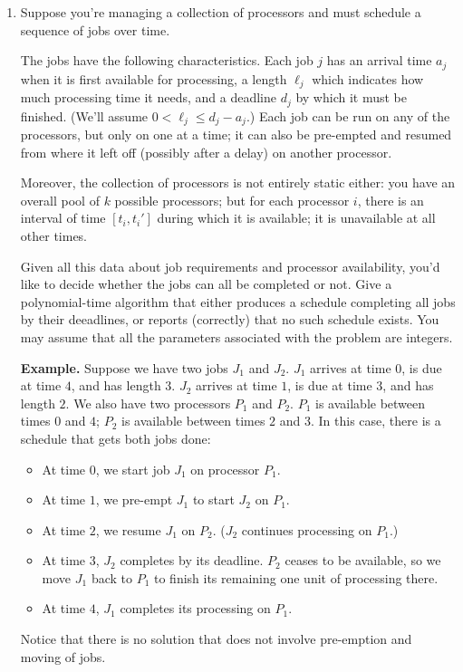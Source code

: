 \documentclass[12pt]{article}
\begin{document}
\begin{enumerate}
\item

Suppose you're managing a collection of processors
and must schedule a sequence of jobs over time.

The jobs have the following characteristics.
Each job $j$ has an arrival time $a_j$
when it is first available for processing,
a length $\ell_j$ which indicates how much processing
time it needs,
and a deadline $d_j$ by which it must be finished.
(We'll assume $0 < \ell_j \leq d_j - a_j$.)
Each job can be run on any of the processors,
but only on one at a time; it can also be
pre-empted and resumed from where it left off
(possibly after a delay) on another processor.

Moreover, the collection of processors is not
entirely static either:
you have an overall pool of $k$ possible processors;
but for each processor $i$, there is an interval of time
$[t_i,t_i']$ during which it is available;
it is unavailable at all other times.

Given all this data about job requirements and processor
availability, you'd like to decide whether
the jobs can all be completed or not.
Give a polynomial-time algorithm that either
produces a schedule completing all jobs by
their deeadlines, or reports (correctly)
that no such schedule exists.
You may assume that all the parameters associated
with the problem are integers.

{\bf Example.}
Suppose we have two jobs $J_1$ and $J_2$.
$J_1$ arrives at time $0$, is due at time $4$,
and has length $3$.
$J_2$ arrives at time $1$, is due at time $3$,
and has length $2$.
We also have two processors $P_1$ and $P_2$.
$P_1$ is available between times $0$ and $4$;
$P_2$ is available between times $2$ and $3$.
In this case, there is a schedule that gets both jobs done:
\begin{itemize}
\item At time $0$, we start job $J_1$ on processor $P_1$.
\item At time $1$, we pre-empt $J_1$ to start $J_2$ on $P_1$.
\item At time $2$, we resume $J_1$ on $P_2$.
($J_2$ continues processing on $P_1$.)
\item At time $3$, $J_2$ completes by its deadline.
$P_2$ ceases to be available, so we move $J_1$ back to
$P_1$ to finish its remaining one unit of processing there.
\item At time $4$, $J_1$ completes its processing on $P_1$.
\end{itemize}
Notice that there is no solution that does not involve
pre-emption and moving of jobs.


\end{enumerate}
\end{document}
